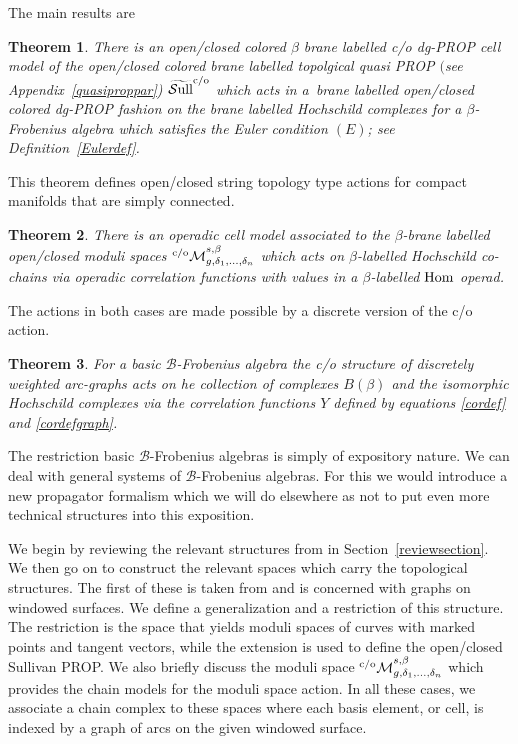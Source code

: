 \documentclass[pdftex]{sigma}
\newtheorem{thm*}{Theorem}
\def\calB{{\mathcal B}}
\def\Mco{{{}^{\rm c/o}\mathcal M}_{g,\delta_1,\dots,\delta_n}^{s,\beta}}
\def\wSull{\widetilde{\rm {\mathcal S}ull}^{\rm c/o}}
\def\B{\mathcal B}
\begin{document}
The main results are
 \begin{thm*}
\label{theoremone}
 There is an  open/closed colored $\beta$ brane labelled c/o dg-PROP cell model of the open/closed
 colored brane labelled
topolgical quasi PROP $($see Appendix~{\rm \ref{quasiproppar})} $\wSull$ which acts
in a~brane labelled open/closed colored dg-PROP fashion on the
brane
 labelled Hochschild complexes for a $\beta$-Frobenius algebra which
 satisfies
the Euler condition $(E)$; see Definition~{\rm \ref{Eulerdef}}.
\end{thm*}

This theorem def\/ines open/closed string topology type actions for
compact manifolds that are simply connected.

\begin{thm*}
\label{theoremtwo}
There is  an operadic cell model associated to the $\beta$-brane labelled open/closed mo\-du\-li spaces $\Mco$
 which acts on $\beta$-labelled Hochschild co-chains via operadic correlation functions with values in
 a $\beta$-labelled $\rm Hom$ operad.
\end{thm*}


The actions in both cases are made possible by a discrete version of
the c/o action.
\begin{thm*}
\label{theoremthree} For a basic  $\B$-Frobenius algebra the c/o
structure of discretely weighted arc-graphs acts  on  he collection
of complexes $B(\beta)$ and the isomorphic Hochschild complexes via
the correlation functions $Y$ defined by equations \eqref{cordef}
and \eqref{cordefgraph}.
\end{thm*}

The restriction basic $\B$-Frobenius algebras is simply of expository nature. We can deal with general systems of $\calB$-Frobenius algebras. For this we would introduce a new
propagator formalism which we will do elsewhere as not to put even more technical
structures into this exposition.


We begin by reviewing the relevant structures from \cite{KP} in Section~\ref{reviewsection}.
We then go on to construct the relevant spaces which carry the topological structures.
The f\/irst of these is taken from \cite{KP} and is concerned with graphs on windowed surfaces. We def\/ine a generalization and a restriction of this structure.
The restriction is the space that yields moduli spaces of curves with marked points and tangent
vectors, while the extension is used to def\/ine the open/closed Sullivan PROP. We also brief\/ly
discuss the moduli space $\Mco$ which provides the chain models for the moduli space action.
In all these cases, we associate a chain complex to these spaces where each
basis element, or cell, is indexed by a graph of arcs on the given windowed surface.
\end{document}
